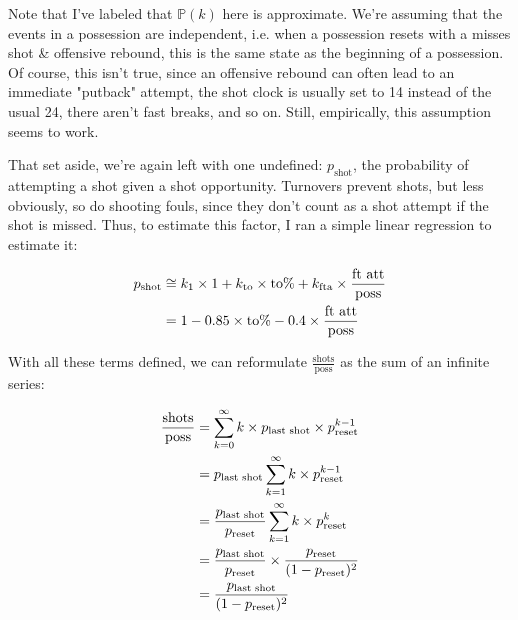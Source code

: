 \documentclass[12 pt]{article}
\begin{document}
\begin{flushleft}
Note that I've labeled that $ \mathbb{P}(k) $ here is approximate. We're assuming that the events in a possession are independent, i.e. when a possession resets with a misses shot \& offensive rebound, this is the same state as the beginning of a possession.
Of course, this isn't true, since an offensive rebound can often lead to an immediate "putback" attempt, the shot clock is usually set to 14 instead of the usual 24, there aren't fast breaks, and so on. Still, empirically, this assumption seems to work.

\vspace{5mm}

That set aside, we're again left with one undefined: $ p_\text{shot} $, the probability of attempting a shot given a shot opportunity.
Turnovers prevent shots, but less obviously, so do shooting fouls, since they don't count as a shot attempt if the shot is missed.
Thus, to estimate this factor, I ran a simple linear regression to estimate it:

\begin{align}
p_\text{shot} &\cong k_\text{1} \times 1 + k_\text{to} \times \text{to}\% + k_\text{fta} \times \frac{\text{ft att}}{\text{poss}} \notag \\
&= 1 - 0.85 \times \text{to}\% - 0.4 \times \frac{\text{ft att}}{\text{poss}} \notag
\end{align}

With all these terms defined, we can reformulate $ \frac{\text{shots}}{\text{poss}} $ as the sum of an infinite series:

\begin{align}
\frac{\text{shots}}{\text{poss}} &= \sum_{k=0}^{\infty}{ k \times p_\text{last shot} \times p_\text{reset}^{k - 1}} \notag \\
&= p_\text{last shot} \sum_{k=1}^{\infty}{ k \times p_\text{reset}^{k - 1}} \notag \\
&= \frac{p_\text{last shot}}{p_\text{reset}} \sum_{k=1}^{\infty}{ k \times p_\text{reset}^k} \notag \\
&= \frac{p_\text{last shot}}{p_\text{reset}} \times \frac{p_\text{reset}}{(1 - p_\text{reset})^2} \notag \\
&= \frac{p_\text{last shot}}{(1 - p_\text{reset})^2} \notag
\end{align}


\end{flushleft}
\end{document}

